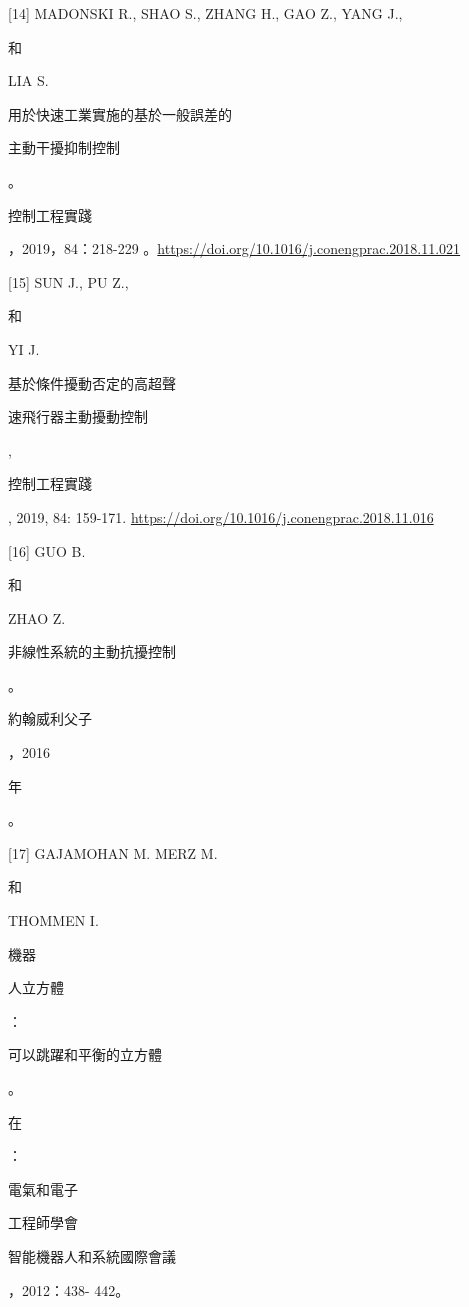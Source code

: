 \documentclass[10pt]{article}
\begin{document}
[14] MADONSKI R., SHAO S., ZHANG H., GAO Z., YANG J., \begin{CJK}{UTF8}{mj}和\end{CJK} LIA S. \begin{CJK}{UTF8}{mj}用於快速工業實施的基於一般誤差的\end{CJK} \begin{CJK}{UTF8}{mj}主動干擾抑制控制\end{CJK}。\begin{CJK}{UTF8}{mj}控制工程實踐\end{CJK}，2019，84：218-229 。\href{https://doi.org/10.1016/j.conengprac.2018.11.021}{https://doi.org/10.1016/j.conengprac.2018.11.021}

[15] SUN J., PU Z., \begin{CJK}{UTF8}{mj}和\end{CJK} YI J. \begin{CJK}{UTF8}{mj}基於條件擾動否定的高超聲\end{CJK} \begin{CJK}{UTF8}{mj}速飛行器主動擾動控制\end{CJK}, \begin{CJK}{UTF8}{mj}控制工程實踐\end{CJK}, 2019, 84: 159-171. \href{https://doi.org/10.1016/j.conengprac.2018.11.016}{https://doi.org/10.1016/j.conengprac.2018.11.016}

[16] GUO B. \begin{CJK}{UTF8}{mj}和\end{CJK} ZHAO Z. \begin{CJK}{UTF8}{mj}非線性系統的主動抗擾控制\end{CJK}。 \begin{CJK}{UTF8}{mj}約翰威利父子\end{CJK}，2016\begin{CJK}{UTF8}{mj}年\end{CJK}。

[17] GAJAMOHAN M. MERZ M. \begin{CJK}{UTF8}{mj}和\end{CJK} THOMMEN I. \begin{CJK}{UTF8}{mj}機器\end{CJK} \begin{CJK}{UTF8}{mj}人立方體\end{CJK}：\begin{CJK}{UTF8}{mj}可以跳躍和平衡的立方體\end{CJK}。\begin{CJK}{UTF8}{mj}在\end{CJK}：\begin{CJK}{UTF8}{mj}電氣和電子\end{CJK} \begin{CJK}{UTF8}{mj}工程師學會\end{CJK} \begin{CJK}{UTF8}{mj}智能機器人和系統國際會議\end{CJK}，2012：438- 442。
\end{document}
